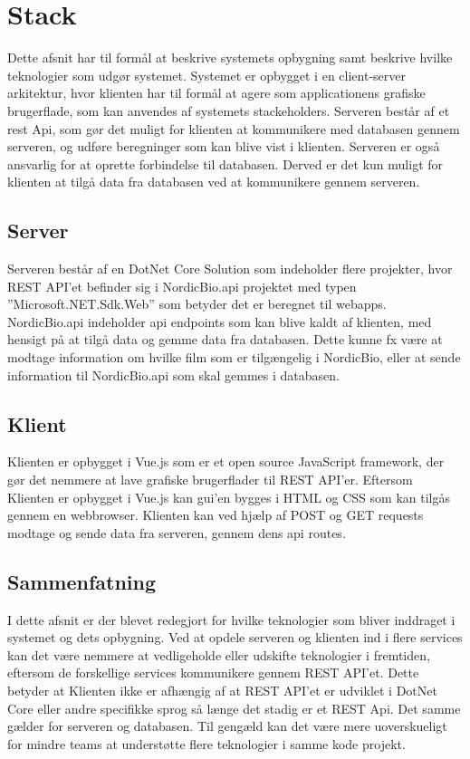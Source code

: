 \section{Stack}
Dette afsnit har til formål at beskrive systemets opbygning samt beskrive hvilke teknologier som udgør systemet. 
Systemet er opbygget i en client-server arkitektur, hvor klienten har til formål at agere som applicationens grafiske 
brugerflade, som kan anvendes af systemets stackeholders. Serveren består af et rest Api, som gør det muligt for klienten 
at kommunikere med databasen gennem serveren, og udføre beregninger som kan blive vist i klienten. Serveren er også 
ansvarlig for at oprette forbindelse til databasen. Derved er det kun muligt for klienten at tilgå data fra databasen 
ved at kommunikere gennem serveren.\\

\subsection{Server}
Serveren består af en DotNet Core Solution som indeholder flere projekter, hvor REST API’et befinder sig i NordicBio.api 
projektet med typen ”Microsoft.NET.Sdk.Web” som betyder det er beregnet til webapps. 
NordicBio.api indeholder api endpoints som kan blive kaldt af klienten, med hensigt på at tilgå data og gemme data fra databasen. 
Dette kunne fx være at modtage information om hvilke film som er tilgængelig i NordicBio, eller at sende information til 
NordicBio.api som skal gemmes i databasen.\\

\subsection{Klient}
Klienten er opbygget i Vue.js som er et open source JavaScript framework, der gør det nemmere at lave grafiske 
brugerflader til REST API’er. Eftersom Klienten er opbygget i Vue.js kan gui’en bygges i HTML og CSS som kan tilgås 
gennem en webbrowser. Klienten kan ved hjælp af POST og GET requests modtage og sende data fra serveren, 
gennem dens api routes.\\

\subsection{Sammenfatning}
I dette afsnit er der blevet redegjort for hvilke teknologier som bliver inddraget i systemet og dets opbygning. 
Ved at opdele serveren og klienten ind i flere services kan det være nemmere at vedligeholde eller udskifte teknologier 
i fremtiden, eftersom de forskellige services kommunikere gennem REST API’et. 
Dette betyder at Klienten ikke er afhængig af at REST API’et er udviklet i DotNet Core eller andre specifikke sprog så 
længe det stadig er et REST Api. Det samme gælder for serveren og databasen. Til gengæld kan det være mere uoverskueligt 
for mindre teams at understøtte flere teknologier i samme kode projekt. 


